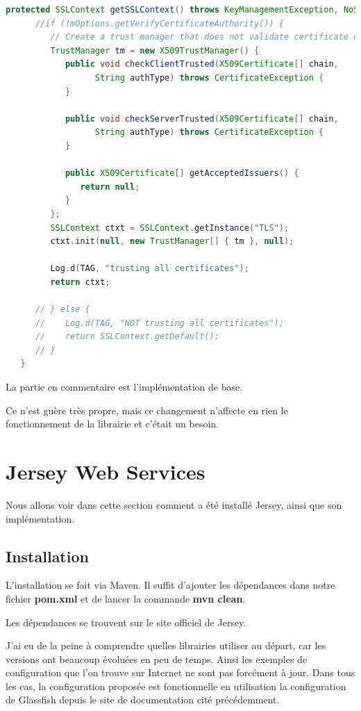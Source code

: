 \begin{lstlisting}[language=Java, caption={classe WebSocketConnection modifié}]
protected SSLContext getSSLContext() throws KeyManagementException, NoSuchAlgorithmException {
      //if (!mOptions.getVerifyCertificateAuthority()) {
         // Create a trust manager that does not validate certificate chains
         TrustManager tm = new X509TrustManager() {
            public void checkClientTrusted(X509Certificate[] chain,
                  String authType) throws CertificateException {
            }

            public void checkServerTrusted(X509Certificate[] chain,
                  String authType) throws CertificateException {
            }

            public X509Certificate[] getAcceptedIssuers() {
               return null;
            }
         };
         SSLContext ctxt = SSLContext.getInstance("TLS");
         ctxt.init(null, new TrustManager[] { tm }, null);

         Log.d(TAG, "trusting all certificates");
         return ctxt;

      // } else {
      //    Log.d(TAG, "NOT trusting all certificates");
      //    return SSLContext.getDefault();
      // }
   }
\end{lstlisting}
La partie en commentaire est l'implémentation de base.

\medskip

Ce n'est guère très propre, mais ce changement n'affecte en rien le fonctionnement de la librairie et c'était un besoin.
\section{Jersey Web Services}
Nous allons voir dans cette section comment a été installé Jersey, ainsi que son implémentation.
\subsection{Installation}
L'installation se fait via Maven. Il suffit d'ajouter les dépendances dans notre fichier \textbf{pom.xml} et de lancer la commande \textbf{mvn clean}.

\medskip

Les dépendances se trouvent sur le site officiel de Jersey.

\medskip

J'ai eu de la peine à comprendre quelles librairies utiliser au départ, car les versions ont beaucoup évoluées en peu de temps. Ainsi les exemples de configuration que l'on trouve sur Internet ne sont pas forcément à jour. Dans tous les cas, la configuration proposée est fonctionnelle en utilisation la configuration de Glassfish depuis le site de documentation cité précédemment.

